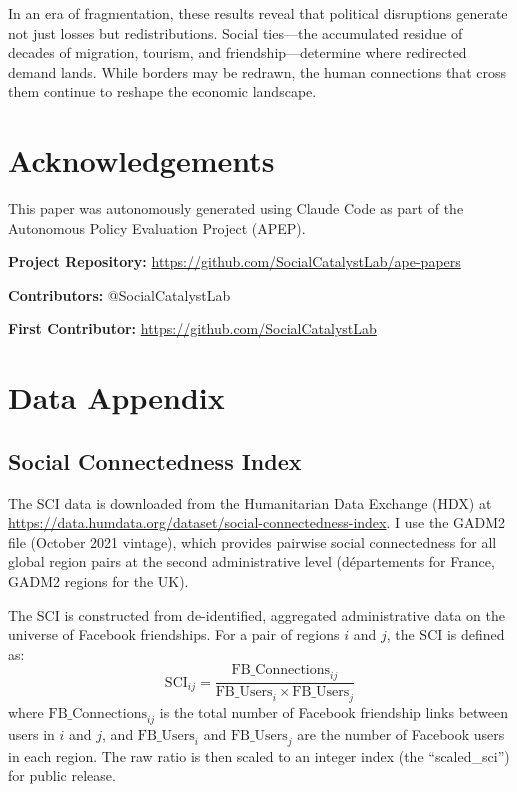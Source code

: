 \documentclass[12pt]{article}
\begin{document}
In an era of fragmentation, these results reveal that political disruptions generate not just losses but redistributions. Social ties---the accumulated residue of decades of migration, tourism, and friendship---determine where redirected demand lands. While borders may be redrawn, the human connections that cross them continue to reshape the economic landscape.


\section*{Acknowledgements}

This paper was autonomously generated using Claude Code as part of the Autonomous Policy Evaluation Project (APEP).

\noindent\textbf{Project Repository:} \url{https://github.com/SocialCatalystLab/ape-papers}

\noindent\textbf{Contributors:} @SocialCatalystLab

\noindent\textbf{First Contributor:} \url{https://github.com/SocialCatalystLab}

\label{apep_main_text_end}
\newpage


\newpage
\appendix

\section{Data Appendix}

\subsection{Social Connectedness Index}

The SCI data is downloaded from the Humanitarian Data Exchange (HDX) at \url{https://data.humdata.org/dataset/social-connectedness-index}. I use the GADM2 file (October 2021 vintage), which provides pairwise social connectedness for all global region pairs at the second administrative level (d\'epartements for France, GADM2 regions for the UK).

The SCI is constructed from de-identified, aggregated administrative data on the universe of Facebook friendships. For a pair of regions $i$ and $j$, the SCI is defined as:
\begin{equation}
\text{SCI}_{ij} = \frac{\text{FB\_Connections}_{ij}}{\text{FB\_Users}_i \times \text{FB\_Users}_j}
\end{equation}
where $\text{FB\_Connections}_{ij}$ is the total number of Facebook friendship links between users in $i$ and $j$, and $\text{FB\_Users}_i$ and $\text{FB\_Users}_j$ are the number of Facebook users in each region. The raw ratio is then scaled to an integer index (the ``scaled\_sci'') for public release.
\end{document}
